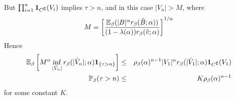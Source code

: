 \documentclass{article}
\begin{document}
  But $\prod_{i=1}^{n}\mathbf{1}_{C^\complement}(V_i)$ implies $\tau > n$, and in this
  case $|V_n| > M$, where
  \[
  M = \left[
        \mathbb{E}_\beta (|B|^\alpha r_\beta(\tilde B; \alpha)) 
        \over
        (1 - \lambda(\alpha)) r_\beta(\tilde v; \alpha)
      \right]^{1/\alpha}
  \]
  Hence
  \begin{eqnarray}
    \mathbb{E}_\beta \left[
      M^\alpha \inf_{|\tilde V_n|} r_\beta(|\tilde V_n|; \alpha) \mathbf{1}_{\{\tau > n\}}\right]
    &\leq& \rho_\beta(\alpha)^{n-1} |V_1|^\alpha r_\beta(|\tilde V_1|; \alpha) \mathbf{1}_{C^\complement}(V_1) \nonumber \\
    \mathbb{P}_\beta(\tau > n) &\leq& K \rho_\beta(\alpha)^{n-1} \label{eq:ret_time}
  \end{eqnarray}
  for some constant $K$.
  
\end{document}
